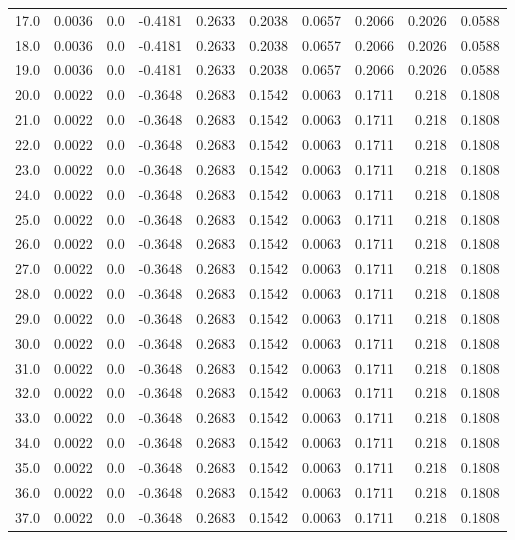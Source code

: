 \begin{longtable}{lrrrrrrrrr}
17.0 & 0.0036 & 0.0 & -0.4181 & 0.2633 & 0.2038 & 0.0657 & 0.2066 & 0.2026 & 0.0588 \\
18.0 & 0.0036 & 0.0 & -0.4181 & 0.2633 & 0.2038 & 0.0657 & 0.2066 & 0.2026 & 0.0588 \\
19.0 & 0.0036 & 0.0 & -0.4181 & 0.2633 & 0.2038 & 0.0657 & 0.2066 & 0.2026 & 0.0588 \\
20.0 & 0.0022 & 0.0 & -0.3648 & 0.2683 & 0.1542 & 0.0063 & 0.1711 & 0.218 & 0.1808 \\
21.0 & 0.0022 & 0.0 & -0.3648 & 0.2683 & 0.1542 & 0.0063 & 0.1711 & 0.218 & 0.1808 \\
22.0 & 0.0022 & 0.0 & -0.3648 & 0.2683 & 0.1542 & 0.0063 & 0.1711 & 0.218 & 0.1808 \\
23.0 & 0.0022 & 0.0 & -0.3648 & 0.2683 & 0.1542 & 0.0063 & 0.1711 & 0.218 & 0.1808 \\
24.0 & 0.0022 & 0.0 & -0.3648 & 0.2683 & 0.1542 & 0.0063 & 0.1711 & 0.218 & 0.1808 \\
25.0 & 0.0022 & 0.0 & -0.3648 & 0.2683 & 0.1542 & 0.0063 & 0.1711 & 0.218 & 0.1808 \\
26.0 & 0.0022 & 0.0 & -0.3648 & 0.2683 & 0.1542 & 0.0063 & 0.1711 & 0.218 & 0.1808 \\
27.0 & 0.0022 & 0.0 & -0.3648 & 0.2683 & 0.1542 & 0.0063 & 0.1711 & 0.218 & 0.1808 \\
28.0 & 0.0022 & 0.0 & -0.3648 & 0.2683 & 0.1542 & 0.0063 & 0.1711 & 0.218 & 0.1808 \\
29.0 & 0.0022 & 0.0 & -0.3648 & 0.2683 & 0.1542 & 0.0063 & 0.1711 & 0.218 & 0.1808 \\
30.0 & 0.0022 & 0.0 & -0.3648 & 0.2683 & 0.1542 & 0.0063 & 0.1711 & 0.218 & 0.1808 \\
31.0 & 0.0022 & 0.0 & -0.3648 & 0.2683 & 0.1542 & 0.0063 & 0.1711 & 0.218 & 0.1808 \\
32.0 & 0.0022 & 0.0 & -0.3648 & 0.2683 & 0.1542 & 0.0063 & 0.1711 & 0.218 & 0.1808 \\
33.0 & 0.0022 & 0.0 & -0.3648 & 0.2683 & 0.1542 & 0.0063 & 0.1711 & 0.218 & 0.1808 \\
34.0 & 0.0022 & 0.0 & -0.3648 & 0.2683 & 0.1542 & 0.0063 & 0.1711 & 0.218 & 0.1808 \\
35.0 & 0.0022 & 0.0 & -0.3648 & 0.2683 & 0.1542 & 0.0063 & 0.1711 & 0.218 & 0.1808 \\
36.0 & 0.0022 & 0.0 & -0.3648 & 0.2683 & 0.1542 & 0.0063 & 0.1711 & 0.218 & 0.1808 \\
37.0 & 0.0022 & 0.0 & -0.3648 & 0.2683 & 0.1542 & 0.0063 & 0.1711 & 0.218 & 0.1808 \\

\end{longtable}
